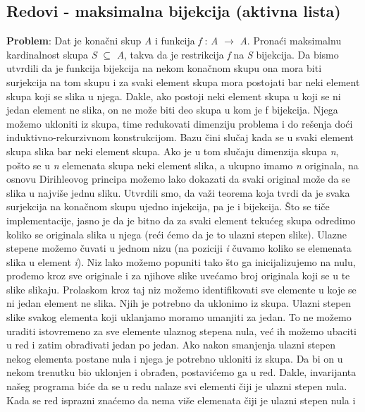 \documentclass{article}
\begin{document}
\subsection{Redovi - maksimalna bijekcija (aktivna lista)}
\textbf{Problem}: Dat je konačni skup \textit{A} i funkcija \textit{f} : \textit{A} $\longrightarrow$ \textit{A}. Pronaći maksimalnu
kardinalnost skupa \textit{S} $\subseteq$ \textit{A}, takva da je restrikcija \textit{f} na \textit{S} bijekcija.
\newline
Da bismo utvrdili da je funkcija bijekcija na nekom
konačnom skupu ona mora biti surjekcija na tom skupu i za svaki element skupa mora postojati bar neki element skupa koji se slika u njega. Dakle, ako postoji neki element skupa u koji se ni jedan element ne slika, on ne može biti deo
skupa u kom je f bijekcija. Njega možemo ukloniti iz skupa, time redukovati dimenziju problema i do rešenja doći induktivno-rekurzivnom konstrukcijom. Bazu čini slučaj kada se u svaki element skupa slika bar neki element skupa. Ako je
u tom slučaju dimenzija skupa \textit{n}, pošto se u \textit{n} elemenata skupa neki element
slika, a ukupno imamo \textit{n} originala, na osnovu Dirihleovog principa možemo lako
dokazati da svaki original može da se slika u najviše jednu sliku. Utvrdili smo, da važi teorema koja tvrdi da je svaka surjekcija na
konačnom skupu ujedno injekcija, pa je i bijekcija.
\newline Što se tiče implementacije, jasno je da je bitno da za svaki element tekućeg
skupa odredimo koliko se originala slika u njega (reći ćemo da je to ulazni stepen
slike). Ulazne stepene možemo čuvati u jednom nizu (na poziciji \textit{i} čuvamo
koliko se elemenata slika u element \textit{i}). Niz lako možemo popuniti tako što ga inicijalizujemo na nulu, prođemo kroz sve originale i za njihove slike uvećamo broj originala koji se u te slike slikaju. Prolaskom kroz taj niz možemo identifikovati
sve elemente u koje se ni jedan element ne slika. Njih je potrebno da uklonimo iz skupa. Ulazni stepen slike svakog
elementa koji uklanjamo moramo umanjiti za jedan. To ne možemo uraditi
istovremeno za sve elemente ulaznog stepena nula, već ih možemo ubaciti u red
i zatim obrađivati jedan po jedan. Ako nakon smanjenja ulazni stepen nekog
elementa postane nula i njega je potrebno ukloniti iz skupa. Da bi on u nekom
trenutku bio uklonjen i obrađen, postavićemo ga u red. Dakle, invarijanta našeg
programa biće da se u redu nalaze svi elementi čiji je ulazni stepen nula. Kada
se red isprazni znaćemo da nema više elemenata čiji je ulazni stepen nula i
\end{document}
